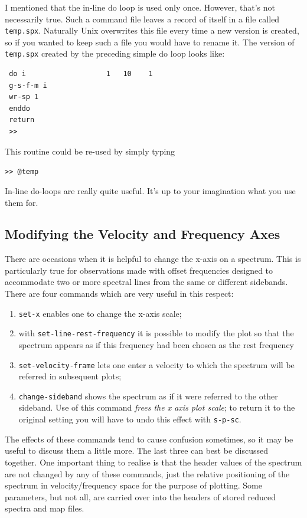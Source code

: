 \documentclass[11pt,twoside]{article}
\begin{document}
I mentioned that the in-line do loop is used only once. However,
that's not necessarily true. Such a command file leaves a record of
itself in a file called {\tt temp.spx}. Naturally Unix overwrites this
file every time a new version is created, so if you wanted to keep
such a file you would have to rename it. The version of {\tt temp.spx}
created by the preceding simple do loop looks like:

\begin{verbatim}
 do i                   1   10    1
 g-s-f-m i
 wr-sp 1
 enddo
 return
 >>
\end{verbatim}
This routine could be re-used by simply typing

\verb|>> @temp|

In-line do-loops are really quite useful. It's up to your imagination
what you use them for.


\subsection{Modifying the Velocity and Frequency Axes}
\label{sec:modifying-axes}
There are occasions when it is helpful to change the x-axis on a
spectrum. This is particularly true for observations made with offset
frequencies designed to accommodate two or more spectral lines from
the same or different sidebands. There are four commands which are
very useful in this respect:
\begin{enumerate}
\item
\verb|set-x| enables one to change the x-axis scale;
\item
with \verb|set-line-rest-frequency| it is possible to modify the plot
so that the spectrum appears as if this frequency had been chosen as
the rest frequency
\item
\verb|set-velocity-frame| lets one enter a velocity to which the
spectrum will be referred in subsequent plots;
\item
\verb|change-sideband| shows the spectrum as if it were referred to
the other sideband. Use of this command {\it frees the x axis plot
scale}; to return it to the original setting you will have to undo
this effect with {\tt s-p-sc}.
\end{enumerate}
The effects of these commands tend to cause confusion sometimes, so it
may be useful to discuss them a little more. The last three can best
be discussed together.  One important thing to realise is that the
header values of the spectrum are not changed by any of these
commands, just the relative positioning of the spectrum in
velocity/frequency space for the purpose of plotting. Some parameters,
but not all, are carried over into the headers of stored reduced
spectra and map files.
\end{document}
